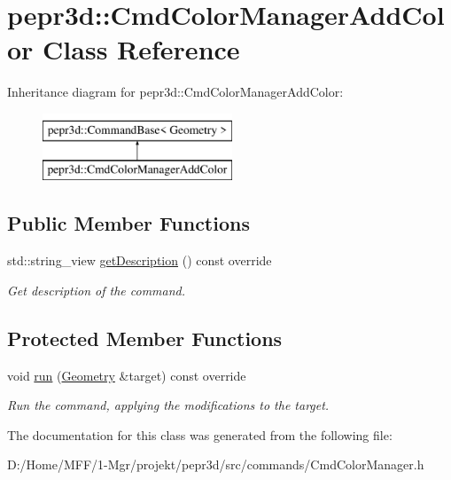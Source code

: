 \hypertarget{classpepr3d_1_1_cmd_color_manager_add_color}{}\section{pepr3d\+::Cmd\+Color\+Manager\+Add\+Color Class Reference}
\label{classpepr3d_1_1_cmd_color_manager_add_color}
Inheritance diagram for pepr3d\+::Cmd\+Color\+Manager\+Add\+Color\+:\begin{figure}[H]
\begin{center}
\leavevmode
\includegraphics[height=2.000000cm]{classpepr3d_1_1_cmd_color_manager_add_color}
\end{center}
\end{figure}
\subsection*{Public Member Functions}
\begin{DoxyCompactItemize}
\item 
\mbox{\label{classpepr3d_1_1_cmd_color_manager_add_color_adbabbf01c7650eb626675f0611806089}} 
std\+::string\+\_\+view \mbox{\hyperlink{classpepr3d_1_1_cmd_color_manager_add_color_adbabbf01c7650eb626675f0611806089}{get\+Description}} () const override
\begin{DoxyCompactList}\small\item\em Get description of the command. \end{DoxyCompactList}\end{DoxyCompactItemize}
\subsection*{Protected Member Functions}
\begin{DoxyCompactItemize}
\item 
\mbox{\label{classpepr3d_1_1_cmd_color_manager_add_color_a900866856f9b243902938f0b6534e713}} 
void \mbox{\hyperlink{classpepr3d_1_1_cmd_color_manager_add_color_a900866856f9b243902938f0b6534e713}{run}} (\mbox{\hyperlink{classpepr3d_1_1_geometry}{Geometry}} \&target) const override
\begin{DoxyCompactList}\small\item\em Run the command, applying the modifications to the target. \end{DoxyCompactList}\end{DoxyCompactItemize}


The documentation for this class was generated from the following file\+:\begin{DoxyCompactItemize}
\item 
D\+:/\+Home/\+M\+F\+F/1-\/\+Mgr/projekt/pepr3d/src/commands/Cmd\+Color\+Manager.\+h\end{DoxyCompactItemize}
